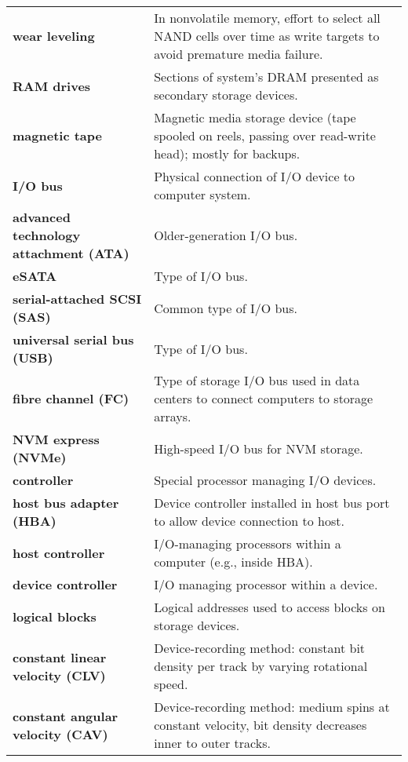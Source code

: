 \begin{tabular}{p{}p{}}
\textbf{wear leveling} & In nonvolatile memory, effort to select all NAND cells over time as write targets to avoid premature media failure. \\
\textbf{RAM drives} & Sections of system's DRAM presented as secondary storage devices. \\
\textbf{magnetic tape} & Magnetic media storage device (tape spooled on reels, passing over read-write head); mostly for backups. \\
\textbf{I/O bus} & Physical connection of I/O device to computer system. \\
\textbf{advanced technology attachment (ATA)} & Older-generation I/O bus. \\
\textbf{eSATA} & Type of I/O bus. \\
\textbf{serial-attached SCSI (SAS)} & Common type of I/O bus. \\
\textbf{universal serial bus (USB)} & Type of I/O bus. \\
\textbf{fibre channel (FC)} & Type of storage I/O bus used in data centers to connect computers to storage arrays. \\
\textbf{NVM express (NVMe)} & High-speed I/O bus for NVM storage. \\
\textbf{controller} & Special processor managing I/O devices. \\
\textbf{host bus adapter (HBA)} & Device controller installed in host bus port to allow device connection to host. \\
\textbf{host controller} & I/O-managing processors within a computer (e.g., inside HBA). \\
\textbf{device controller} & I/O managing processor within a device. \\
\textbf{logical blocks} & Logical addresses used to access blocks on storage devices. \\
\textbf{constant linear velocity (CLV)} & Device-recording method: constant bit density per track by varying rotational speed. \\
\textbf{constant angular velocity (CAV)} & Device-recording method: medium spins at constant velocity, bit density decreases inner to outer tracks. \\
\bottomrule
\end{tabular}

